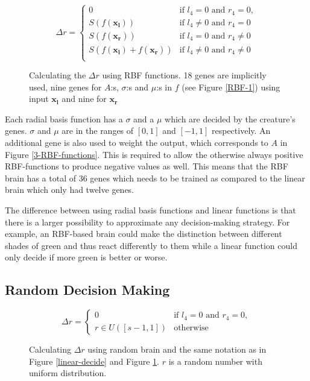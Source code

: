 \documentclass[a4paper,11pt]{kth-mag}
\begin{document}
\begin{figure}
\begin{equation}
\Delta r =
\begin{cases}
	0 										&	\text{if $l_4 = 0$ and $r_4 = 0$},\\
	S(f(\mathbf{x_l})) 						&	\text{if $l_4 \neq 0$ and $r_4 = 0$}\\
	S(f(\mathbf{x_r})) 						&	\text{if $l_4 = 0$ and $r_4 \neq 0$}\\
	S(f(\mathbf{x_l}) + f(\mathbf{x_r})) 	&	\text{if $l_4 \neq 0$ and $r_4 \neq 0$}\\
\end{cases}	
\end{equation}
\caption{Calculating the $\Delta r$ using RBF functions. 18 genes are implicitly used, nine genes for $A$:s, $\sigma$:s and $\mu$:s in $f$ (see Figure \ref{RBF-1}) using input $\mathbf{x_l}$ and nine for $\mathbf{x_r}$ }
\label{RBF-decide}
	\end{figure}

Each radial basis function has a $\sigma$ and a $\mu$ which are decided by the creature's genes. $\sigma$ and $\mu$ are in the ranges of $[0,1]$ and $[-1,1]$ respectively. An additional gene is also used to weight the output, which corresponds to $A$ in Figure \ref{3-RBF-functions}. This is required to allow the otherwise always positive RBF-functions to produce negative values as well. This means that the RBF brain has a total of 36 genes which needs to be trained as compared to the linear brain which only had twelve genes.

The difference between using radial basis functions and linear functions is that there is a larger possibility to approximate any decision-making strategy. For example, an RBF-based brain could make the distinction between different shades of green and thus react differently to them while a linear function could only decide if more green is better or worse.

\subsection{Random Decision Making}

\begin{figure}
\begin{equation}
\Delta r = 
\begin{cases}
	0 		& 	\text{if $l_4 = 0$ and $r_4 = 0$},\\
	r \in U([s-1,1])		&	\text{otherwise}
\end{cases}
\end{equation}
\caption{Calculating $\Delta r$ using random brain and the same notation as in Figure \ref{linear-decide} and Figure \ref{RBF-decide}. $r$ is a random number with uniform distribution.} 
\label{random-decide}
\end{figure}
\end{document}
